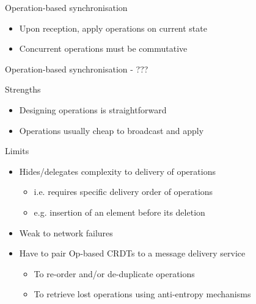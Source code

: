 \begin{frame}{Operation-based synchronisation}
\begin{figure}[!ht]
{
        }
    \end{figure}

    \pause

    \begin{itemize}
        \item Upon reception, \alert{apply operations on current state}
        \item \alert{Concurrent operations} must be \alert{commutative}
    \end{itemize}
\end{frame}

\begin{frame}{Operation-based synchronisation - ???}

    \begin{block}{Strengths}
        \begin{itemize}
            \item Designing operations is straightforward
            \item Operations usually cheap to broadcast and apply
        \end{itemize}
    \end{block}

    \pause

    \begin{block}{Limits}
        \begin{itemize}
            \item Hides/delegates complexity to delivery of operations
            \begin{itemize}
                \item i.e. requires specific delivery order of operations
                \item e.g. insertion of an element before its deletion
            \end{itemize}
            \pause
            \item Weak to network failures
            \pause
            \item Have to pair Op-based CRDTs to a message delivery service
            \begin{itemize}
                \item To re-order and/or de-duplicate operations
                \item To retrieve lost operations using anti-entropy mechanisms
            \end{itemize}
        \end{itemize}
    \end{block}
\end{frame}